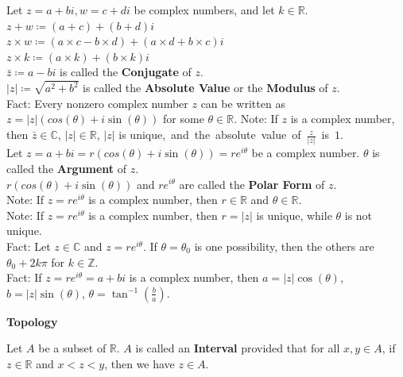 \documentclass[11pt]{article}
\newcommand{\R}{\mathbb{R}}
\newcommand{\Z}{\mathbb{Z}}
\newcommand{\Complex}{\mathbb{C}}
\newcommand{\note}{\color{gray}Note: \color{black}}
\newcommand{\fact}{\color{gray}Fact: \color{black}}
\begin{document}
		\noindent Let $z=a+bi,w=c+di$ be complex numbers, and let $k \in \R$.\\ $z+w \coloneqq (a+c)+(b+d)i$\\ $z \times w \coloneqq (a \times c - b \times d)+(a \times d + b \times c)i$\\ $z \times k \coloneqq (a \times k)+(b \times k)i$\\ $\bar{z} \coloneqq a-bi$ is called the \textbf{Conjugate} of $z$.\\ $|z| \coloneqq \sqrt{a^2+b^2}$ is called the \textbf{Absolute Value} or the \textbf{Modulus} of $z$.\\
		\fact Every nonzero complex number $z$ can be written as $z=|z|(cos(\theta)+i\sin(\theta))$ for some $\theta \in \R$.
		\note If $z$ is a complex number, then $\bar{z} \in \Complex$, $|z| \in \R$, $|z|$ is unique,\mbox{ and the absolute value of $\frac{z}{|z|}$ is $1$.}\\

		\noindent Let $z = a+bi = r(cos(\theta)+i\sin(\theta))=re^{i\theta}$ be a complex number. $\theta$ is called the \textbf{Argument} of $z$.\\ $r(cos(\theta)+i\sin(\theta))$ and $re^{i\theta}$ are called the \textbf{Polar Form} of $z$.\\
		\note If $z=re^{i\theta}$ is a complex number, then $r \in \R$ and $\theta \in \R$.\\
		\note If $z=re^{i\theta}$ is a complex number, then $r=|z|$ is unique, while $\theta$ is not unique.\\
		\fact Let $z \in \Complex$ and $z=re^{i\theta}$. If $\theta=\theta_0$ is one possibility, then the others are $\theta_0+2k \pi$ for $k \in \Z$.\\
		\fact If $z=re^{i\theta}=a+bi$ is a complex number, then $a=|z| \cos(\theta)$, $b=|z| \sin(\theta)$, $\theta = \tan^{-1}(\frac{b}{a})$.
		
	\clearpage





	
	\LARGE 	\color{red}
		\noindent \textbf{Topology}\\
	\normalsize	\color{black}
		
		\noindent Let $A$ be a subset of $\R$. $A$ is called an \textbf{Interval} provided that for all $x,y \in A$, if $z \in \R$ and $x<z<y$, then we have $z \in A$.\\
		
\end{document}
